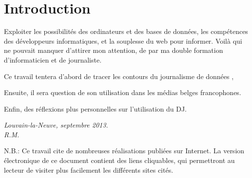 
\chapter*{Introduction}

Exploiter les possibilités des ordinateurs et des bases de données, les compétences des développeurs informatiques,
et la souplesse du web pour informer. Voilà qui ne pouvait manquer d'attirer mon attention, de par ma double formation d'informaticien et de journaliste.

Ce travail tentera d'abord de tracer les contours du  \og journalisme de données \fg, 

Ensuite, il sera question de son utilisation dans les médias belges francophones.

Enfin, des réflexions plus personnelles sur l'utilisation du DJ.




\begin{flushright}
\em
Louvain-la-Neuve, septembre 2013. 
\\ R.M.
\em
\end{flushright}

\small
N.B.: Ce travail cite de nombreuses réalisations publiées sur Internet. La version 
électronique de ce document contient des liens cliquables, qui permettront au lecteur 
de visiter plus facilement les différents sites cités.
\normalsize

